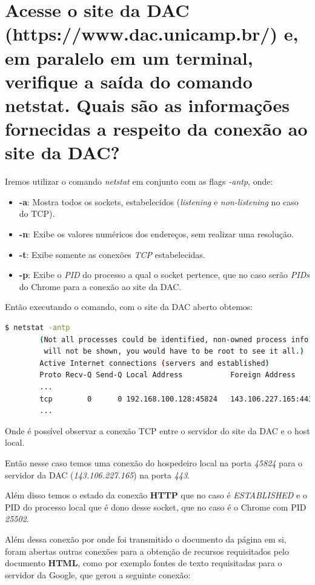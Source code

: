 \documentclass[12pt,a4paper]{report}
\begin{document}
\section{Acesse o site da DAC (https://www.dac.unicamp.br/) e, em paralelo em um terminal, verifique a saída do comando netstat. Quais são as informações fornecidas a respeito da conexão ao site da DAC?}
Iremos utilizar o comando \emph{netstat} em conjunto com as flags \emph{-antp}, onde:
\begin{itemize}
	\item \textbf{-a}: Mostra todos os sockets, estabelecidos (\emph{listening} e \emph{non-listening} no caso do TCP). 
	\item \textbf{-n}: Exibe os valores numéricos dos endereços, sem realizar uma resolução.
	\item \textbf{-t}: Exibe somente as conexões \emph{TCP} estabelecidas.
	\item \textbf{-p}: Exibe o \emph{PID} do processo a qual o socket pertence, que no caso serão \emph{PIDs} do Chrome para a conexão ao site da DAC.
\end{itemize}

Então executando o comando, com o site da DAC aberto obtemos:

\begin{lstlisting}[language=bash]
        $ netstat -antp   
        (Not all processes could be identified, non-owned process info
         will not be shown, you would have to be root to see it all.)
        Active Internet connections (servers and established)
        Proto Recv-Q Send-Q Local Address           Foreign Address         State       PID/Program name    
        ...
        tcp        0      0 192.168.100.128:45824   143.106.227.165:443     ESTABLISHED 25502/chrome --type 
        ...
\end{lstlisting}

Onde é possível observar a conexão TCP entre o servidor do site da DAC e o host local.

Então nesse caso temos uma conexão do hospedeiro local na porta \emph{45824} para o servidor da DAC (\emph{143.106.227.165}) na porta \emph{443}.

Além disso temos o estado da conexão \textbf{HTTP} que no caso é \emph{ESTABLISHED} e o PID do processo local que é dono desse socket, que no caso é o Chrome com PID \emph{25502}.

Além dessa conexão por onde foi transmitido o documento da página em si, foram abertas outras conexões para a obtenção de recursos requisitados pelo documento \textbf{HTML}, como por exemplo fontes de texto requisitadas para o servidor da Google, que gerou a seguinte conexão:
\end{document}
